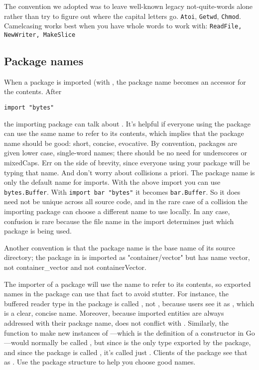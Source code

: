 The convention we adopted was to leave well-known legacy
not-quite-words alone rather than try to figure out where
the capital letters go.  \lstinline{Atoi}, \lstinline{Getwd},
\lstinline{Chmod}.
Camelcasing works best when you have whole words
to work with: \lstinline{ReadFile, NewWriter, MakeSlice}

\subsection{Package names}
When a package is imported (with , the package name becomes 
an accessor for the contents. After
\begin{lstlisting}
import "bytes"
\end{lstlisting}
the importing package can talk about . It's helpful if
everyone using the package can use the same name to refer to its
contents, which implies that the package name should be good: short,
concise, evocative. By convention, packages are given lower case,
single-word names; there should be no need for underscores or mixedCaps.
Err on the side of brevity, since everyone using your package will be
typing that name. And don't worry about collisions a priori. The package
name is only the default name for imports. With the above import 
you can use \lstinline{bytes.Buffer}. With \lstinline{import bar "bytes"}
it becomes \lstinline{bar.Buffer}.
So it does need not be unique across
all source code, and in the rare case of a collision the importing
package can choose a different name to use locally. In any case,
confusion is rare because the file name in the import determines just
which package is being used.

Another convention is that the package name is the base name of its
source directory; the package in  is imported as
"container/vector" but has name vector, not container\_vector and not
containerVector.

The importer of a package will use the name to refer to its contents, so 
exported names in the package can use that fact to avoid
stutter. For instance, the buffered reader type in the  package is
called , not , because users see it as
,
which is a clear, concise name. Moreover, because imported entities are
always addressed with their package name,  does not conflict
with . Similarly, the function to make new instances of
---which is the definition of a constructor in Go---would normally
be called , but since  is the only type exported by the
package, and since the package is called , it's called
just .
Clients of the package see that as . Use the package structure
to help you choose good names.

